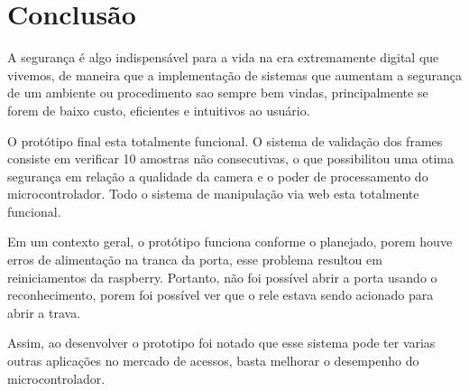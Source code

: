 \documentclass[conference,compsoc]{IEEEtran}
\begin{document}
\section{Conclusão}

A segurança é algo indispensável para a vida na era extremamente digital que vivemos, de maneira que a implementação de sistemas que aumentam a segurança de um ambiente ou procedimento sao sempre bem vindas, principalmente se forem de baixo custo, eficientes e intuitivos ao usuário.

 O protótipo final esta totalmente funcional. O sistema de validação dos frames consiste em verificar 10 amostras não consecutivas, o que possibilitou uma otima segurança em relação a qualidade da camera e o poder de processamento do microcontrolador. Todo o sistema de manipulação via web esta totalmente funcional. 
 
 Em um contexto geral, o protótipo funciona conforme o planejado, porem houve erros de alimentação na tranca da porta, esse problema resultou em reiniciamentos da raspberry. Portanto, não foi possível abrir a porta usando o reconhecimento, porem foi possível ver que o rele estava sendo acionado para abrir a trava. 
 
 Assim, ao desenvolver o prototipo foi notado que esse sistema pode ter varias outras aplicações no mercado de acessos, basta melhorar o desempenho do microcontrolador.  
	  
	  
         

	


\end{document}
